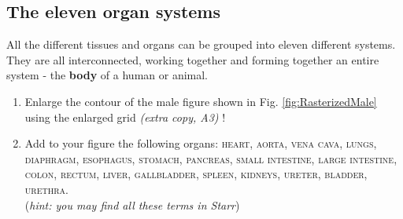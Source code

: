 

\subsection{The eleven organ systems}\label{ssc:AnatOrgansysteme} 
		
		\begin{mdframed}[style=exampledefault, userdefinedwidth=12cm,frametitle={Starr 28.7}\label{mat:TenOrgansystems}]	  
			All the different tissues and organs can be grouped into eleven different systems. They are all interconnected, working together and forming together an entire system - the \textbf{body} of a human or animal.
		\end{mdframed}



	\begin{enumerate}[itemsep=0.5em, leftmargin=*]   %

		\item Enlarge the contour of the male figure shown in Fig. \ref{fig:RasterizedMale} using the enlarged grid \textit{(extra copy, A3) }!
		
		\item Add to your figure the following organs: \textsc{ heart, aorta, vena cava, lungs, diaphragm, esophagus, stomach, pancreas, small intestine, large intestine, colon, rectum, liver, gallbladder, spleen, kidneys, ureter, bladder, urethra. }\\
			(\textit{hint: you may find all these terms in   Starr})
		
	\end{enumerate}
			   

